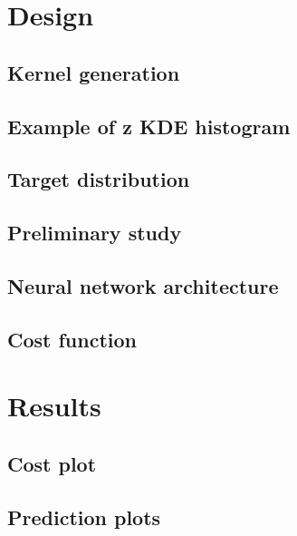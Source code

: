 \documentclass[aspectratio=169, 10pt]{beamer}
\begin{document}
\section{Design}

\subsection{Kernel generation}


\subsection{Example of z KDE histogram}


\subsection{Target distribution}


\subsection{Preliminary study}


\subsection{Neural network architecture}



\subsection{Cost function}



\section{Results}

\subsection{Cost plot}


\subsection{Prediction plots}

\end{document}
